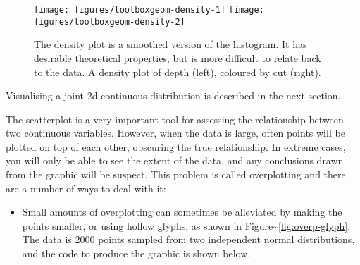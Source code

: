 \begin{Shaded}
\begin{Highlighting}[]
\NormalTok{, } \NormalTok{(}\NormalTok{, }\NormalTok{))}
\NormalTok{, } \NormalTok{(}\NormalTok{, }\NormalTok{), }
        \NormalTok{(}\NormalTok{))}
\end{Highlighting}
\end{Shaded}

\begin{figure}
\texttt{[image: figures/toolboxgeom-density-1]} \texttt{[image: figures/toolboxgeom-density-2]} \caption{The density plot is a smoothed version of the histogram. It has desirable theoretical properties, but is more difficult to relate back to the data. A density plot of depth (left), coloured by cut (right).\label{fig:geom-density}}
\end{figure}

Visualising a joint 2d continuous distribution is described in the next
section.


The scatterplot is a very important tool for assessing the relationship
between two continuous variables. However, when the data is large, often
points will be plotted on top of each other, obscuring the true
relationship. In extreme cases, you will only be able to see the extent
of the data, and any conclusions drawn from the graphic will be suspect.
This problem is called overplotting and there are a number of ways to
deal with it: 

\begin{itemize}
\itemsep1pt\parskip0pt
\item
  Small amounts of overplotting can sometimes be alleviated by making
  the points smaller, or using hollow glyphs, as shown in
  Figure\textasciitilde{}\ref{fig:overp-glyph}. The data is 2000 points
  sampled from two independent normal distributions, and the code to
  produce the graphic is shown below. 
\end{itemize}

